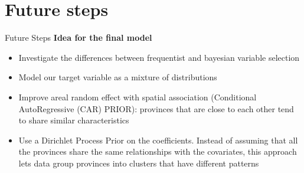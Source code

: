 \section{Future steps} 
\begin{frame}{Future Steps} 
\vspace{0.5cm}
    \textbf{Idea for the final model}
    \footnotesize
    \begin{itemize}
        \item Investigate the differences between frequentist and bayesian variable selection
        \item Model our target variable as a mixture of distributions
        \item Improve areal random effect with spatial association (Conditional AutoRegressive (CAR) PRIOR): provinces that are close to each other tend to share similar characteristics
        \item Use a Dirichlet Process Prior on the coefficients. Instead of assuming that all the provinces share the same relationships with the covariates, this approach lets data group provinces into clusters that have different patterns
    \end{itemize}
    
\end{frame}